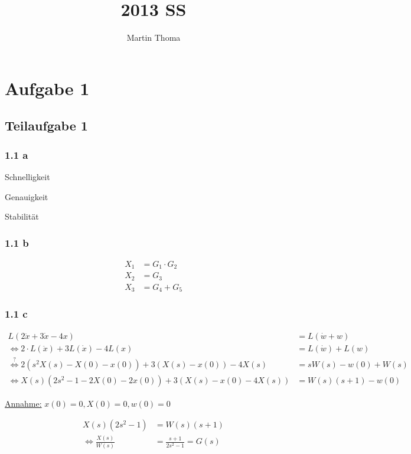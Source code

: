 \documentclass[a4paper]{scrartcl}
\begin{document}
 \title{2013 SS}
 \author{Martin Thoma}

 \setcounter{section}{1}
 \section*{Aufgabe 1}
 \subsection*{Teilaufgabe 1}
 \subsubsection*{1.1 a}
  \begin{enumerate*}[label=(\arabic*)]
      \item Schnelligkeit
      \item Genauigkeit
      \item Stabilität
  \end{enumerate*}

  \subsubsection*{1.1 b}
  \begin{align}
      X_1 &= G_1 \cdot G_2\\
      X_2 &= G_3\\
      X_3 &= G_4 + G_5
  \end{align}

  \subsubsection*{1.1 c}
  \begin{align}
      L(2 \ddot{x} + 3 \dot{x} - 4x) &= L(\dot{w} + w)\\
      \Leftrightarrow 2 \cdot L(\ddot{x}) + 3 L(\dot{x}) - 4 L(x) &= L(\dot{w}) + L(w)\\
      \overset{?}{\Leftrightarrow} 2 (s^2 X(s) - X(0) - x(0)) + 3(X(s) - x(0)) - 4 X(s) &= s W(s) - w(0) + W(s)\\
      \Leftrightarrow X(s) (2s^2 - 1 - 2 X(0) - 2x(0)) + 3(X(s) - x(0) - 4 X(s)) &= W(s)(s+1) - w(0)
  \end{align}

  \underline{Annahme:} $x(0) = 0, X(0) = 0, w(0) = 0$ 

  \begin{align}
      X(s) (2s^2 - 1) &= W(s) (s+1)\\
      \Leftrightarrow \frac{X(s)}{W(s)} &= \frac{s+1}{2s^2 - 1} = G(s)
  \end{align}
\end{document}
